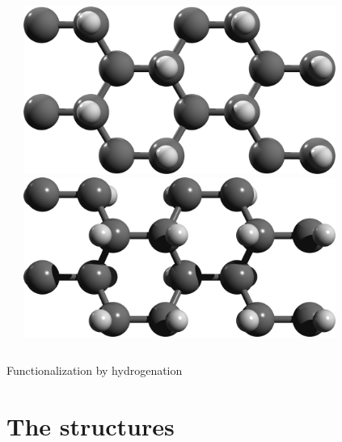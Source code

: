\documentclass{beamer}
\begin{document}
\begin{frame}
\begin{columns}
\begin{center}
\vspace{5mm}
\end{center}


\centering
\begin{center}
\includegraphics[width=0.8\textwidth]{figs/up1.png}\\

\vspace{7mm}
\includegraphics[width=0.8\textwidth]{figs/boat.png}\\

\vspace{3mm}
\end{center}

\end{columns}

\begin{center}

{\huge Functionalization by hydrogenation}
\end{center}
\end{frame}



\section{The structures}
\end{document}
